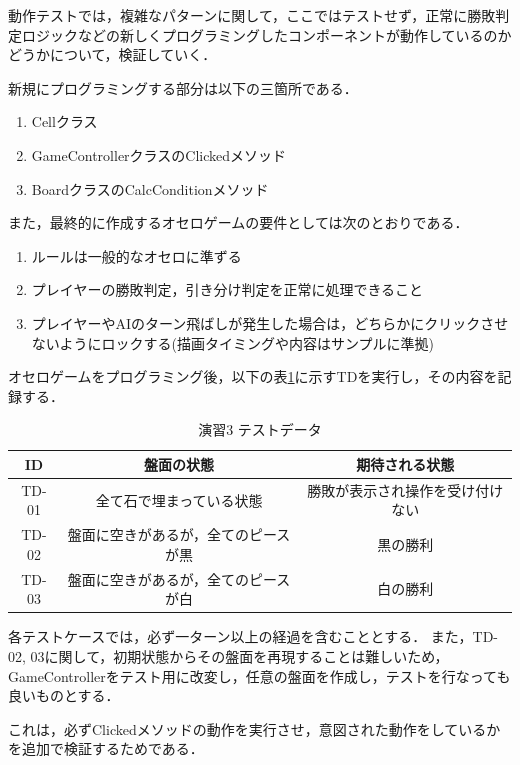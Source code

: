 \documentclass[platex,dvipdfmx,12pt]{jsarticle}
\begin{document}
動作テストでは，複雑なパターンに関して，ここではテストせず，正常に勝敗判定ロジックなどの新しくプログラミングしたコンポーネントが動作しているのかどうかについて，検証していく．

新規にプログラミングする部分は以下の三箇所である．

\begin{enumerate}
  \item Cellクラス
  \item GameControllerクラスのClickedメソッド
  \item BoardクラスのCalcConditionメソッド
\end{enumerate}

また，最終的に作成するオセロゲームの要件としては次のとおりである．

\begin{enumerate}
  \item ルールは一般的なオセロに準ずる
  \item プレイヤーの勝敗判定，引き分け判定を正常に処理できること
  \item プレイヤーやAIのターン飛ばしが発生した場合は，どちらかにクリックさせないようにロックする(描画タイミングや内容はサンプルに準拠)
\end{enumerate}

オセロゲームをプログラミング後，以下の表\ref{tab:enshu3-tds}に示すTDを実行し，その内容を記録する．

\begin{table}[H]
  \centering
  \caption{演習3 テストデータ}
  \label{tab:enshu3-tds}
  \begin{tabular}{ccc}
    ID & 盤面の状態 & 期待される状態 \\
    \hline
    TD-01 & 全て石で埋まっている状態 & 勝敗が表示され操作を受け付けない \\
    TD-02 & 盤面に空きがあるが，全てのピースが黒 & 黒の勝利 \\
    TD-03 & 盤面に空きがあるが，全てのピースが白 & 白の勝利 \\
  \end{tabular}
\end{table}

各テストケースでは，必ず一ターン以上の経過を含むこととする．
また，TD-02, 03に関して，初期状態からその盤面を再現することは難しいため，GameControllerをテスト用に改変し，任意の盤面を作成し，テストを行なっても良いものとする．

これは，必ずClickedメソッドの動作を実行させ，意図された動作をしているかを追加で検証するためである．
\end{document}
